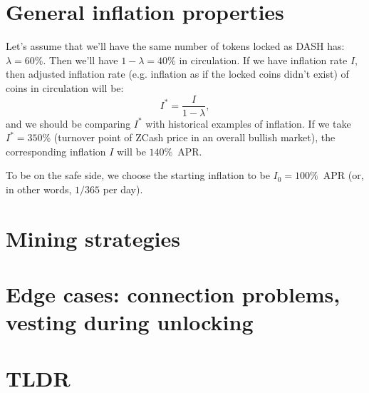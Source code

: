 \documentclass[longbibliography,nofootinbib,twocolumn]{revtex4-1}
\begin{document}
\section{General inflation properties}

Let's assume that we'll have the same number of tokens locked as DASH has: $\lambda=60\%$.
Then we'll have $1-\lambda=40\%$ in circulation.
If we have inflation rate $I$, then adjusted inflation rate (e.g. inflation as if the locked coins didn't exist) of coins in circulation will be:
\begin{equation}
    I^* = \frac{I}{1-\lambda},
\end{equation}
and we should be comparing $I^*$ with historical examples of inflation.
If we take $I^*=350\%$ (turnover point of ZCash price in an overall bullish market), the corresponding inflation $I$ will be $140\%$~APR.

To be on the safe side, we choose the starting inflation to be $I_0=100\%$~APR (or, in other words, $1/365$ per day).

\section{Mining strategies}

\section{Edge cases: connection problems, vesting during unlocking}

\section{TLDR}


\end{document}
